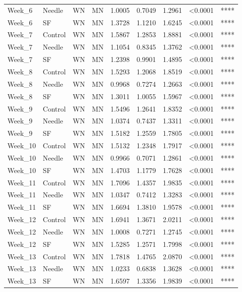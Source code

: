 \documentclass[
  12pt,
  letterpaper,
]{article}
\begin{document}
\begin{longtable}{llccrrrlc}
Week\_6 & Needle & WN & MN & 1.0005 & 0.7049 & 1.2961 & <0.0001 & **** \\ 
Week\_6 & SF & WN & MN & 1.3728 & 1.1210 & 1.6245 & <0.0001 & **** \\ 
Week\_7 & Control & WN & MN & 1.5867 & 1.2853 & 1.8881 & <0.0001 & **** \\ 
Week\_7 & Needle & WN & MN & 1.1054 & 0.8345 & 1.3762 & <0.0001 & **** \\ 
Week\_7 & SF & WN & MN & 1.2398 & 0.9901 & 1.4895 & <0.0001 & **** \\ 
Week\_8 & Control & WN & MN & 1.5293 & 1.2068 & 1.8519 & <0.0001 & **** \\ 
Week\_8 & Needle & WN & MN & 0.9968 & 0.7274 & 1.2663 & <0.0001 & **** \\ 
Week\_8 & SF & WN & MN & 1.3011 & 1.0055 & 1.5967 & <0.0001 & **** \\ 
Week\_9 & Control & WN & MN & 1.5496 & 1.2641 & 1.8352 & <0.0001 & **** \\ 
Week\_9 & Needle & WN & MN & 1.0374 & 0.7437 & 1.3311 & <0.0001 & **** \\ 
Week\_9 & SF & WN & MN & 1.5182 & 1.2559 & 1.7805 & <0.0001 & **** \\ 
Week\_10 & Control & WN & MN & 1.5132 & 1.2348 & 1.7917 & <0.0001 & **** \\ 
Week\_10 & Needle & WN & MN & 0.9966 & 0.7071 & 1.2861 & <0.0001 & **** \\ 
Week\_10 & SF & WN & MN & 1.4703 & 1.1779 & 1.7628 & <0.0001 & **** \\ 
Week\_11 & Control & WN & MN & 1.7096 & 1.4357 & 1.9835 & <0.0001 & **** \\ 
Week\_11 & Needle & WN & MN & 1.0347 & 0.7412 & 1.3283 & <0.0001 & **** \\ 
Week\_11 & SF & WN & MN & 1.6694 & 1.3810 & 1.9578 & <0.0001 & **** \\ 
Week\_12 & Control & WN & MN & 1.6941 & 1.3671 & 2.0211 & <0.0001 & **** \\ 
Week\_12 & Needle & WN & MN & 1.0008 & 0.7271 & 1.2745 & <0.0001 & **** \\ 
Week\_12 & SF & WN & MN & 1.5285 & 1.2571 & 1.7998 & <0.0001 & **** \\ 
Week\_13 & Control & WN & MN & 1.7818 & 1.4765 & 2.0870 & <0.0001 & **** \\ 
Week\_13 & Needle & WN & MN & 1.0233 & 0.6838 & 1.3628 & <0.0001 & **** \\ 
Week\_13 & SF & WN & MN & 1.6597 & 1.3356 & 1.9839 & <0.0001 & **** \\ 

\end{longtable}
\end{document}
